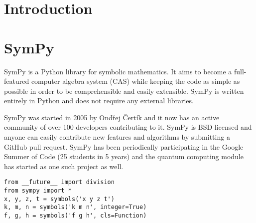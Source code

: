 \documentclass[aps,pra,groupedaddress]{revtex4-1}
\begin{document}
\pacs{}

\maketitle

\section{Introduction}

\section{SymPy}

SymPy is a Python library for symbolic mathematics. It aims to become a
full-featured computer algebra system (CAS) while keeping the code as simple as
possible in order to be comprehensible and easily extensible. SymPy is written
entirely in Python and does not require any external libraries.

SymPy was started in 2005 by Ondřej Čertík and it now has an active community
of over 100 developers contributing to it. SymPy is BSD licensed and anyone can
easily contribute new features and algorithms by submitting a GitHub pull
request. SymPy has been periodically participating in the Google Summer of Code
(25 students in 5 years) and the quantum computing module has started as one
such project as well.

\begin{verbatim}
from __future__ import division
from sympy import *
x, y, z, t = symbols('x y z t')
k, m, n = symbols('k m n', integer=True)
f, g, h = symbols('f g h', cls=Function)
\end{verbatim}
\end{document}
